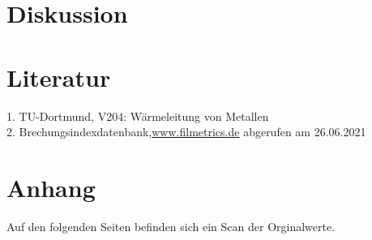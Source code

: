 \section{Diskussion}

\section{Literatur}
1. TU-Dortmund, V204: Wärmeleitung von Metallen\\
2. Brechungsindexdatenbank,\hyperlink{https://www.filmetrics.de/refractive-index-database}{www.filmetrics.de} abgerufen am 26.06.2021\\
\section{Anhang}
Auf den folgenden Seiten befinden sich ein Scan der Orginalwerte.